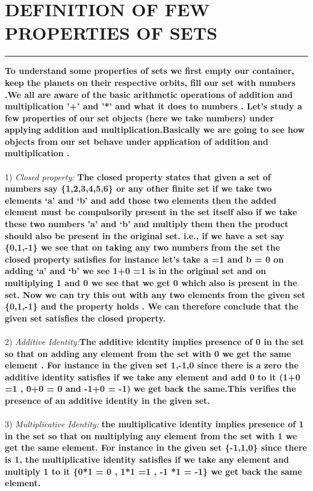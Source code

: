 \documentclass{article}
\begin{document}
\section * {DEFINITION OF FEW PROPERTIES OF SETS }
\hrule 
\bigskip
\textbf{To understand some properties of sets we first empty our container, keep the planets on their respective orbits, fill our set with numbers .We all are aware of the basic arithmetic operations of addition and multiplication '+' and '*' and what it does to numbers . Let's study a few properties of our set objects (here we take numbers) under applying addition and multiplication.Basically we are going to see how objects from our set behave under application of addition and multiplication .}
\\
\\
1) \textit{Closed property:\quad}\textbf{ The closed property states that given a set of numbers say \{1,2,3,4,5,6\} or any other finite set  if we take two elements ‘a’ and ‘b’ and add those two elements then the added element must be compulsorily present in the set itself also if we take these two numbers ’a’ and ‘b’ and multiply them then the product should also be present in the original set.  i.e., if we have a set  say \{0,1,-1\} we see that on taking any two numbers from the set the closed property satisfies for instance let’s take a =1 and b = 0 on adding ‘a’ and ‘b’ we see 1+0 =1 is in the original set and on multiplying 1 and 0 we see that we get 0 which also is present in the set. Now we can try this out with any two elements from the given set \{0,1,-1\} and the property holds . We can therefore conclude that the given set satisfies the closed property.
}
\\
\\
2) \textit{Additive Identity:\quad}\textbf{The additive identity implies presence of 0 in the set  so that on adding any element from the set with 0 we get the same element . For instance in the given set {1,-1,0} since there is a zero the additive identity satisfies if we take any element and add 0 to it (1+0 =1 , 0+0 = 0 and -1+0 = -1) we get back the same.This verifies the presence of  an additive identity in the given set.}
\\
\\
3) \textit{Multiplicative Identity:\quad }\textbf{ the multiplicative identity implies presence of 1 in the set so that on multiplying any element from the set with 1 we get the same element. For instance in the given set \{-1,1,0\} since there is 1, the multiplicative identity satisfies if we take any element and multiply 1 to it \{0*1 = 0 , 1*1 =1 , -1 *1 = -1\} we get back the same element.  }
\pagebreak
\end{document}
